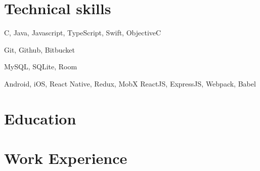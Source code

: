 \documentclass[11pt,a4paper]{moderncv}
\begin{document}
\maketitle

\section{Technical skills}
           {C, Java, Javascript, TypeScript, Swift, ObjectiveC}

           {Git, Github, Bitbucket}

           {MySQL, SQLite, Room}

           {Android, iOS, React Native, Redux, MobX}
           {ReactJS, ExpressJS, Webpack, Babel}

\section{Education}

\section{Work Experience}
\end{document}
